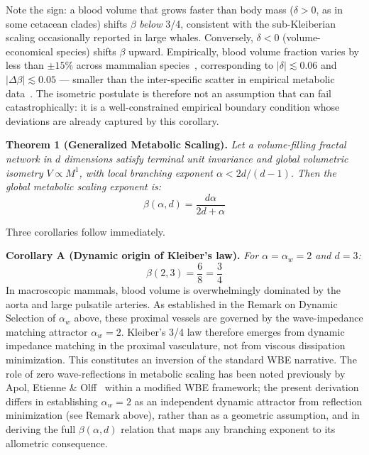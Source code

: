\documentclass[11pt,a4paper]{article}
\theoremstyle{remark}
\newcounter{manualthm}
\begin{document}
\noindent Note the sign: a blood volume that grows faster than body mass ($\delta > 0$, as in some cetacean clades) shifts $\beta$ \emph{below} 3/4, consistent with the sub-Kleiberian scaling occasionally reported in large whales. Conversely, $\delta < 0$ (volume-economical species) shifts $\beta$ upward. Empirically, blood volume fraction varies by less than $\pm15\%$ across mammalian species~\cite{peters1983}, corresponding to $|\delta| \lesssim 0.06$ and $|\Delta\beta| \lesssim 0.05$ --- smaller than the inter-specific scatter in empirical metabolic data~\cite{glazier2005, white2013}. The isometric postulate is therefore not an assumption that can fail catastrophically: it is a well-constrained empirical boundary condition whose deviations are already captured by this corollary.

\vspace{0.5em}
\noindent \textbf{Theorem 1 (Generalized Metabolic Scaling).}\label{thm:scaling} \textit{Let a volume-filling fractal network in $d$ dimensions satisfy terminal unit invariance and global volumetric isometry $V \propto M^1$, with local branching exponent $\alpha < 2d/(d-1)$. Then the global metabolic scaling exponent is:}
\begin{equation*}
\beta(\alpha, d) = \frac{d\alpha}{2d + \alpha}
\end{equation*}

\noindent Three corollaries follow immediately.

\vspace{0.5em}
\noindent \textbf{Corollary A (Dynamic origin of Kleiber's law).} \textit{For $\alpha = \alpha_w = 2$ and $d=3$:}
\begin{equation*}
\beta(2, 3) = \frac{6}{8} = \frac{3}{4}
\end{equation*}
In macroscopic mammals, blood volume is overwhelmingly dominated by the aorta
and large pulsatile arteries. As established in the Remark on Dynamic Selection
of $\alpha_w$ above, these proximal vessels are governed by the wave-impedance
matching attractor $\alpha_w=2$. Kleiber's 3/4 law therefore emerges from
dynamic impedance matching in the proximal vasculature, not from viscous
dissipation minimization. This constitutes an inversion of the standard WBE
narrative. The role of zero wave-reflections in metabolic scaling has been noted
previously by Apol, Etienne \& Olff~\cite{apol2008} within a modified WBE
framework; the present derivation differs in establishing $\alpha_w=2$ as an
independent dynamic attractor from reflection minimization (see Remark above),
rather than as a geometric assumption, and in deriving the full
$\beta(\alpha,d)$ relation that maps any branching exponent to its allometric
consequence.
\end{document}
